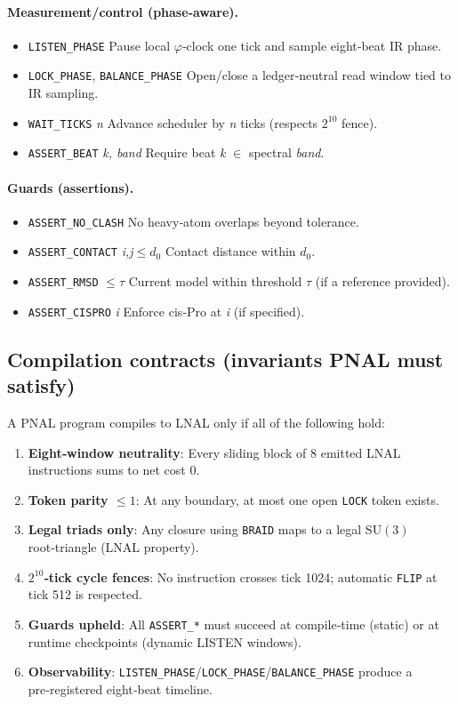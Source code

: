 \documentclass[12pt,a4paper]{article}
\begin{document}
\paragraph{Measurement/control (phase‑aware).}
\begin{itemize}
  \item \texttt{LISTEN\_PHASE} \quad Pause local $\varphi$‑clock one tick and sample eight‑beat IR phase.
  \item \texttt{LOCK\_PHASE}, \texttt{BALANCE\_PHASE} \quad Open/close a ledger‑neutral read window tied to IR sampling.
  \item \texttt{WAIT\_TICKS} \textit{n} \quad Advance scheduler by \textit{n} ticks (respects $2^{10}$ fence).
  \item \texttt{ASSERT\_BEAT} \textit{k, band} \quad Require beat \textit{k} $\in$ spectral \textit{band}.
\end{itemize}

\paragraph{Guards (assertions).}
\begin{itemize}
  \item \texttt{ASSERT\_NO\_CLASH} \quad No heavy‑atom overlaps beyond tolerance.
  \item \texttt{ASSERT\_CONTACT} \textit{i,j$\le d_0$} \quad Contact distance within $d_0$.
  \item \texttt{ASSERT\_RMSD} \textit{$\le\tau$} \quad Current model within threshold \textit{$\tau$} (if a reference provided).
  \item \texttt{ASSERT\_CISPRO} \textit{i} \quad Enforce cis‑Pro at \textit{i} (if specified).
\end{itemize}

\subsection{Compilation contracts (invariants PNAL must satisfy)}
A PNAL program compiles to LNAL only if all of the following hold:
\begin{enumerate}
  \item \textbf{Eight‑window neutrality}: Every sliding block of 8 emitted LNAL instructions sums to net cost 0.
  \item \textbf{Token parity $\le 1$}: At any boundary, at most one open \texttt{LOCK} token exists.
  \item \textbf{Legal triads only}: Any closure using \texttt{BRAID} maps to a legal $\mathrm{SU}(3)$ root‑triangle (LNAL property).
  \item \textbf{$2^{10}$‑tick cycle fences}: No instruction crosses tick 1024; automatic \texttt{FLIP} at tick 512 is respected.
  \item \textbf{Guards upheld}: All \texttt{ASSERT\_*} must succeed at compile‑time (static) or at runtime checkpoints (dynamic LISTEN windows).
  \item \textbf{Observability}: \texttt{LISTEN\_PHASE}/\texttt{LOCK\_PHASE}/\texttt{BALANCE\_PHASE} produce a pre‑registered eight‑beat timeline.
\end{enumerate}
\end{document}
